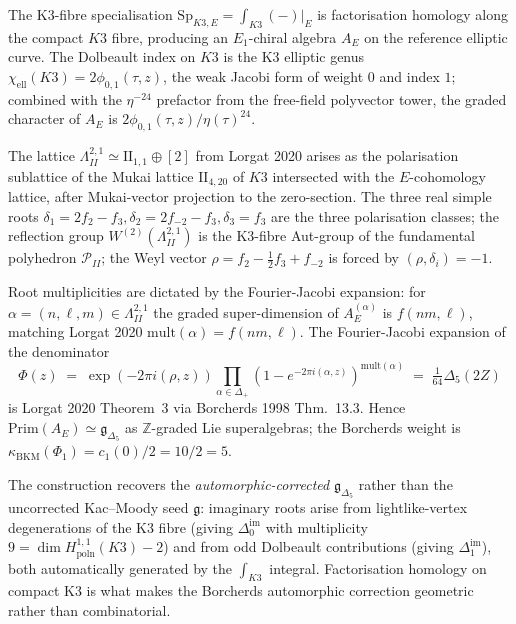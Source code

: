 \documentclass[11pt]{amsart}
\providecommand{\Z}{\mathbb{Z}}
\providecommand{\fg}{\mathfrak{g}}
\providecommand{\gDelta}{\mathfrak{g}_{\Delta_5}}
\providecommand{\Lat}{\Lambda}
\providecommand{\WII}{W^{(2)}(\Lat^{2,1}_{II})}
\providecommand{\PII}{\mathcal{P}_{II}}
\providecommand{\Sp}{\mathrm{Sp}}
\providecommand{\Prim}{\mathrm{Prim}}
\providecommand{\mult}{\mathrm{mult}}
\providecommand{\kBKM}{\kappa_{\mathrm{BKM}}}
\theoremstyle{plain}
\theoremstyle{definition}
\theoremstyle{remark}
\begin{document}
The K3-fibre specialisation $\Sp_{K3,E}=\int_{K3}(-)|_E$ is
factorisation homology along the compact $K3$ fibre, producing an
$E_1$-chiral algebra $A_E$ on the reference elliptic curve. The Dolbeault
index on $K3$ is the K3 elliptic genus $\chi_{\mathrm{ell}}(K3)=
2\phi_{0,1}(\tau,z)$, the weak Jacobi form of weight $0$ and index $1$;
combined with the $\eta^{-24}$ prefactor from the free-field polyvector
tower, the graded character of $A_E$ is $2\phi_{0,1}(\tau,z)/
\eta(\tau)^{24}$.

The lattice $\Lat^{2,1}_{II}\simeq\mathrm{II}_{1,1}\oplus[2]$ from
Lorgat 2020 arises as the polarisation sublattice of the Mukai lattice
$\mathrm{II}_{4,20}$ of $K3$ intersected with the $E$-cohomology lattice,
after Mukai-vector projection to the zero-section. The three real simple
roots $\delta_1=2f_2-f_3,\delta_2=2f_{-2}-f_3,\delta_3=f_3$ are the
three polarisation classes; the reflection group $\WII$ is the K3-fibre
Aut-group of the fundamental polyhedron $\PII$; the Weyl vector
$\rho=f_2-\tfrac12 f_3+f_{-2}$ is forced by $(\rho,\delta_i)=-1$.

Root multiplicities are dictated by the Fourier-Jacobi expansion: for
$\alpha=(n,\ell,m)\in\Lat^{2,1}_{II}$ the graded super-dimension of
$A_E^{(\alpha)}$ is $f(nm,\ell)$, matching Lorgat 2020
$\mult(\alpha)=f(nm,\ell)$. The Fourier-Jacobi expansion of the denominator
\[
\Phi(z)\;=\;\exp(-2\pi i(\rho,z))\!\prod_{\alpha\in\Delta_+}\!(1-e^{-2\pi
i(\alpha,z)})^{\mult(\alpha)}\;=\;\tfrac{1}{64}\Delta_5(2Z)
\]
is Lorgat 2020 Theorem~3 via Borcherds 1998 Thm.~13.3. Hence
$\Prim(A_E)\simeq\gDelta$ as $\Z$-graded Lie superalgebras; the
Borcherds weight is $\kBKM(\Phi_1)=c_1(0)/2=10/2=5$.

The construction recovers the \emph{automorphic-corrected} $\gDelta$
rather than the uncorrected Kac--Moody seed $\fg$: imaginary roots arise
from lightlike-vertex degenerations of the K3 fibre (giving
$\Delta^{\mathrm{im}}_0$ with multiplicity $9=\dim H^{1,1}_{\mathrm{poln}}
(K3)-2$) and from odd Dolbeault contributions (giving
$\Delta^{\mathrm{im}}_1$), both automatically generated by the
$\int_{K3}$ integral. Factorisation homology on compact K3 is what
makes the Borcherds automorphic correction geometric rather than
combinatorial.
\end{document}
